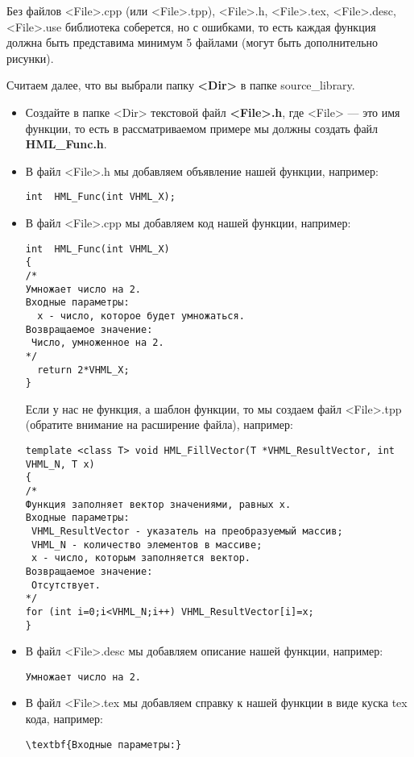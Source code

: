 Без файлов <File>.cpp (или <File>.tpp), <File>.h, <File>.tex, <File>.desc, <File>.use библиотека соберется, но с ошибками, то есть каждая функция должна быть представима минимум 5 файлами (могут быть дополнительно рисунки).

Считаем далее, что вы выбрали папку \textbf{<Dir>} в папке source\_library. 

\begin{itemize}
\item Создайте в папке <Dir> текстовой файл \textbf{<File>.h}, где <File> --- это имя функции, то есть в рассматриваемом примере мы должны создать файл \textbf{HML\_Func.h}.
\item В файл <File>.h мы добавляем объявление нашей функции, например:
\begin{lstlisting}[label=examplefileh, caption=Содержимое HML\_Func.h]
int  HML_Func(int VHML_X);
\end{lstlisting}
\item В файл <File>.cpp мы добавляем код нашей функции, например:
\begin{lstlisting}[label=examplefilecpp, caption=Содержимое HML\_Func.cpp]
int  HML_Func(int VHML_X)
{
/*
Умножает число на 2.
Входные параметры:
  x - число, которое будет умножаться.
Возвращаемое значение:
 Число, умноженное на 2.
*/
  return 2*VHML_X;
}
\end{lstlisting}

Если у нас не функция, а шаблон функции, то мы создаем файл <File>.tpp (обратите внимание на расширение файла), например:
\begin{lstlisting}[label=examplefiletpp, caption=Содержимое HML\_FillVector.tpp]
template <class T> void HML_FillVector(T *VHML_ResultVector, int VHML_N, T x)
{
/*
Функция заполняет вектор значениями, равных x.
Входные параметры:
 VHML_ResultVector - указатель на преобразуемый массив;
 VHML_N - количество элементов в массиве;
 x - число, которым заполняется вектор.
Возвращаемое значение:
 Отсутствует.
*/
for (int i=0;i<VHML_N;i++) VHML_ResultVector[i]=x;
}
\end{lstlisting}

\item В файл <File>.desc мы добавляем описание нашей функции, например:
\begin{lstlisting}[label=examplefiledesc, caption=Содержимое HML\_Func.desc]
Умножает число на 2.
\end{lstlisting}

\item В файл <File>.tex мы добавляем справку к нашей функции в виде куска tex кода, например:
\begin{lstlisting}[label=examplefiletex, caption=Содержимое HML\_Func.tex]
\textbf{Входные параметры:}


\end{lstlisting}
\end{itemize}
